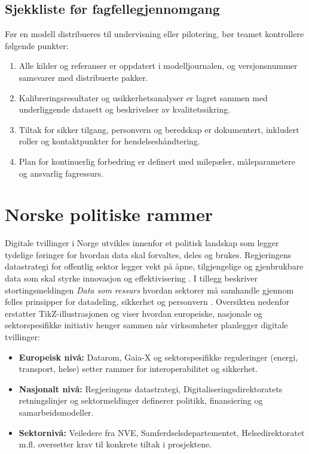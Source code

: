 \subsection{Sjekkliste før fagfellegjennomgang}
Før en modell distribueres til undervisning eller pilotering, bør teamet kontrollere følgende punkter:
\begin{enumerate}
    \item Alle kilder og referanser er oppdatert i modelljournalen, og versjonsnummer samsvarer med distribuerte pakker.
    \item Kalibreringsresultater og usikkerhetsanalyser er lagret sammen med underliggende datasett og beskrivelser av kvalitetssikring.
    \item Tiltak for sikker tilgang, personvern og beredskap er dokumentert, inkludert roller og kontaktpunkter for hendelseshåndtering.
    \item Plan for kontinuerlig forbedring er definert med milepæler, måleparametere og ansvarlig fagressurs.
\end{enumerate}

\section{Norske politiske rammer}
Digitale tvillinger i Norge utvikles innenfor et politisk landskap som legger tydelige føringer for hvordan data skal forvaltes, deles og brukes. Regjeringens datastrategi for offentlig sektor legger vekt på åpne, tilgjengelige og gjenbrukbare data som skal styrke innovasjon og effektivisering \citep{regjeringen2022datastrategi}. I tillegg beskriver stortingsmeldingen \emph{Data som ressurs} hvordan sektorer må samhandle gjennom felles prinsipper for datadeling, sikkerhet og personvern \citep{meldst22datasomressurs}. Oversikten nedenfor erstatter TikZ-illustrasjonen og viser hvordan europeiske, nasjonale og sektorspesifikke initiativ henger sammen når virksomheter planlegger digitale tvillinger:
\begin{itemize}
    \item \textbf{Europeisk nivå:} Datarom, Gaia-X og sektorspesifikke reguleringer (energi, transport, helse) setter rammer for interoperabilitet og sikkerhet.
    \item \textbf{Nasjonalt nivå:} Regjeringens datastrategi, Digitaliseringsdirektoratets retningslinjer og sektormeldinger definerer politikk, finansiering og samarbeidsmodeller.
    \item \textbf{Sektornivå:} Veiledere fra NVE, Samferdselsdepartementet, Helsedirektoratet m.fl. oversetter krav til konkrete tiltak i prosjektene.
\end{itemize}

